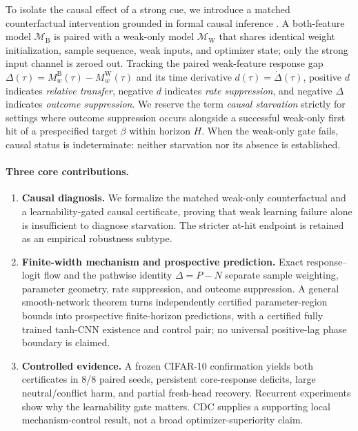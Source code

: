 \documentclass{article}
\theoremstyle{definition}
\theoremstyle{remark}
\newcommand{\Bcond}{\mathrm{B}}
\newcommand{\Wcond}{\mathrm{W}}
\begin{document}
To isolate the causal effect of a strong cue, we introduce a matched counterfactual intervention grounded in formal causal inference \citep{pearl2009causality,peters2017elements}. A both-feature model $\mathcal{M}_{\Bcond}$ is paired with a weak-only model $\mathcal{M}_{\Wcond}$ that shares identical weight initialization, sample sequence, weak inputs, and optimizer state; only the strong input channel is zeroed out. Tracking the paired weak-feature response gap $\Delta(\tau) = M_w^{\Bcond}(\tau) - M_w^{\Wcond}(\tau)$ and its time derivative $d(\tau) = \dot{\Delta}(\tau)$, positive $d$ indicates \emph{relative transfer}, negative $d$ indicates \emph{rate suppression}, and negative $\Delta$ indicates \emph{outcome suppression}. We reserve the term \emph{causal starvation} strictly for settings where outcome suppression occurs alongside a successful weak-only first hit of a prespecified target $\beta$ within horizon $H$. When the weak-only gate fails, causal status is indeterminate: neither starvation nor its absence is established.

\paragraph{Three core contributions.}
\begin{enumerate}[leftmargin=*]
  \item \textbf{Causal diagnosis.} We formalize the matched weak-only counterfactual and a learnability-gated causal certificate, proving that weak learning failure alone is insufficient to diagnose starvation. The stricter at-hit endpoint is retained as an empirical robustness subtype.
  \item \textbf{Finite-width mechanism and prospective prediction.} Exact response--logit flow and the pathwise identity $\Delta=P-N$ separate sample weighting, parameter geometry, rate suppression, and outcome suppression. A general smooth-network theorem turns independently certified parameter-region bounds into prospective finite-horizon predictions, with a certified fully trained tanh-CNN existence and control pair; no universal positive-lag phase boundary is claimed.
  \item \textbf{Controlled evidence.} A frozen CIFAR-10 confirmation yields both certificates in 8/8 paired seeds, persistent core-response deficits, large neutral/conflict harm, and partial fresh-head recovery. Recurrent experiments show why the learnability gate matters. CDC supplies a supporting local mechanism-control result, not a broad optimizer-superiority claim.
\end{enumerate}
\end{document}
